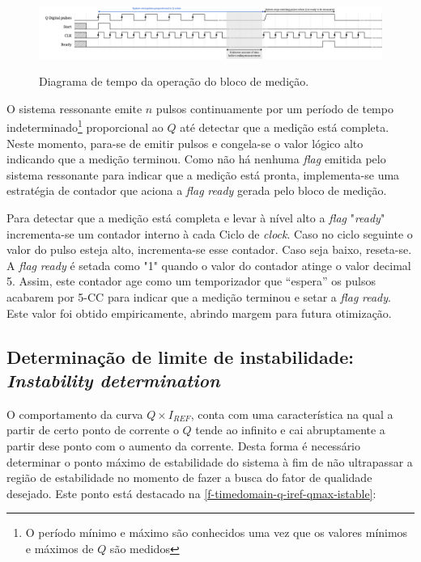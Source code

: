 \begin{figure}[H]
    \centering
    \caption{Diagrama de tempo da operação do bloco de medição.}
    \includegraphics{fig/timing-q-measurement.pdf}
    \label{f-timing-q-measurement}
\end{figure}

O sistema ressonante emite $n$ pulsos continuamente por um período de tempo indeterminado\footnote{O período mínimo e máximo são conhecidos uma vez que os valores mínimos e máximos de $Q$ são medidos} proporcional ao $Q$ até detectar que a medição está completa. Neste momento, para-se de emitir pulsos e  congela-se o valor lógico alto indicando que a medição terminou. Como não há nenhuma \textit{\textit{flag}} emitida pelo sistema ressonante para indicar que a medição está pronta, implementa-se uma estratégia de contador que aciona a \textit{flag} \textit{ready} gerada pelo bloco de medição.

Para detectar que a medição está completa e levar à nível alto a \textit{flag} "\textit{ready}"\; incrementa-se um contador interno à cada Ciclo de \textit{clock}. Caso no ciclo seguinte o valor do pulso esteja alto, incrementa-se esse contador. Caso seja baixo, reseta-se. A \textit{flag} \textit{ready} é setada como "1"\; quando o valor do contador atinge o valor decimal 5. Assim, este contador age como um temporizador que ``espera'' os pulsos acabarem por 5-CC para indicar que a medição terminou e setar a \textit{flag} \textit{ready}. Este valor foi obtido empiricamente, abrindo margem para futura otimização.


\subsection{Determinação de limite de instabilidade: \textit{Instability determination}}\label{ss-instability-determination}

O comportamento da curva $Q \times I_{REF}$, conta com uma característica na qual a partir de certo ponto de corrente o $Q$ tende ao infinito e cai abruptamente a partir dese ponto com o aumento da corrente. Desta forma é necessário determinar o ponto máximo de estabilidade do sistema à fim de não ultrapassar a região de estabilidade no momento de fazer a busca do fator de qualidade desejado. Este ponto está destacado na \autoref{f-timedomain-q-iref-qmax-istable}:

